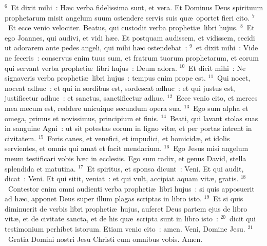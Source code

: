 ${}^{6}$~Et dixit mihi~: H\ae c verba fidelissima sunt, et vera. Et Dominus Deus spirituum prophetarum misit angelum suum ostendere servis suis qu\ae\ oportet fieri cito.
${}^{7}$~Et ecce venio velociter. Beatus, qui custodit verba propheti\ae\ libri hujus.
${}^{8}$~Et ego Joannes, qui audivi, et vidi h\ae c. Et postquam audissem, et vidissem, cecidi ut adorarem ante pedes angeli, qui mihi h\ae c ostendebat~:
${}^{9}$~et dixit mihi~: Vide ne feceris~: conservus enim tuus sum, et fratrum tuorum prophetarum, et eorum qui servant verba propheti\ae\ libri hujus~: Deum adora.
${}^{10}$~Et dicit mihi~: Ne signaveris verba propheti\ae\ libri hujus~: tempus enim prope est.
${}^{11}$~Qui nocet, noceat adhuc~: et qui in sordibus est, sordescat adhuc~: et qui justus est, justificetur adhuc~: et sanctus, sanctificetur adhuc.
${}^{12}$~Ecce venio cito, et merces mea mecum est, reddere unicuique secundum opera sua.
${}^{13}$~Ego sum alpha et omega, primus et novissimus, principium et finis.
${}^{14}$~Beati, qui lavant stolas suas in sanguine Agni~: ut sit potestas eorum in ligno vit\ae , et per portas intrent in civitatem.
${}^{15}$~Foris canes, et venefici, et impudici, et homicid\ae , et idolis servientes, et omnis qui amat et facit mendacium.
${}^{16}$~Ego Jesus misi angelum meum testificari vobis h\ae c in ecclesiis. Ego sum radix, et genus David, stella splendida et matutina.
${}^{17}$~Et spiritus, et sponsa dicunt~: Veni. Et qui audit, dicat~: Veni. Et qui sitit, veniat~: et qui vult, accipiat aquam vit\ae , gratis.
${}^{18}$~Contestor enim omni audienti verba propheti\ae\ libri hujus~: si quis apposuerit ad h\ae c, apponet Deus super illum plagas scriptas in libro isto.
${}^{19}$~Et si quis diminuerit de verbis libri propheti\ae\ hujus, auferet Deus partem ejus de libro vit\ae , et de civitate sancta, et de his qu\ae\ scripta sunt in libro isto~:
${}^{20}$~dicit qui testimonium perhibet istorum. Etiam venio cito~: amen. Veni, Domine Jesu.
${}^{21}$~Gratia Domini nostri Jesu Christi cum omnibus vobis. Amen.
